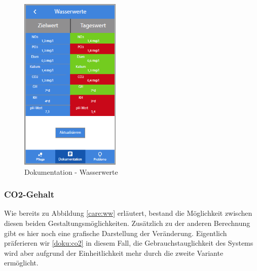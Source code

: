 \begin{figure}
	\centering
	\includegraphics[width=180px,height=\textheight,
keepaspectratio]{Wasserwerte}
	\caption{Dokumentation - Wasserwerte}
	\label{doku:ww}
\end{figure}

\subsubsection{CO2-Gehalt}
Wie bereits zu Abbildung \ref{care:ww} erläutert, bestand die Möglichkeit zwischen diesen beiden Gestaltungsmöglichkeiten. Zusätzlich zu der anderen Berechnung gibt es hier noch eine grafische Darstellung der Veränderung. Eigentlich präferieren wir \ref{doku:co2} in diesem Fall, die Gebrauchstauglichkeit des Systems wird aber aufgrund der Einheitlichkeit mehr durch die zweite Variante ermöglicht.  

